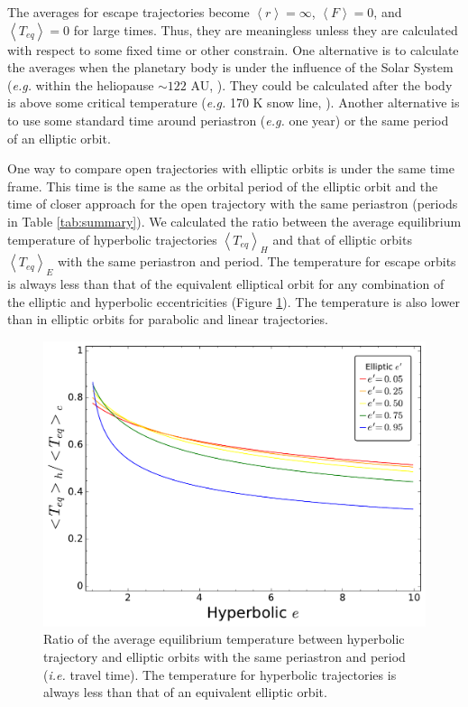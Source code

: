 \documentclass[a4paper,fleqn,usenatbib]{mnras}
\begin{document}
The averages for escape trajectories become $\left<r\right>=\infty$, $\left<F\right>=0$, and $\left<T_{eq}\right>=0$ for large times. Thus, they are meaningless unless they are calculated with respect to some fixed time or other constrain. One alternative is to calculate the averages when the planetary body is under the influence of the Solar System (\emph{e.g.} within the heliopause $\sim122$ AU, \citet{2017ApJ...834..197C}). They could be calculated after the body is above some critical temperature (\emph{e.g.} 170 K snow line, \citet{2008ApJ...673..502K}). Another alternative is to use some standard time around periastron (\emph{e.g.} one year) or the same period of an elliptic orbit.

One way to compare open trajectories with elliptic orbits is under the same time frame. This time is the same as the orbital period of the elliptic orbit and the time of closer approach for the open trajectory with the same periastron (periods in Table \ref{tab:summary}). We calculated the ratio between the average equilibrium temperature of hyperbolic trajectories $\left<T_{eq}\right>_H$ and that of elliptic orbits $\left<T_{eq}\right>_E$ with the same periastron and period. The temperature for escape orbits is always less than that of the equivalent elliptical orbit for any combination of the elliptic and hyperbolic eccentricities (Figure \ref{fig4}). The temperature is also lower than in elliptic orbits for parabolic and linear trajectories.

\begin{figure}
\includegraphics[width=\columnwidth]{f4.pdf}
\caption{Ratio of the average equilibrium temperature between hyperbolic trajectory and elliptic orbits with the same periastron and period (\emph{i.e.} travel time). The temperature for hyperbolic trajectories is always less than that of an equivalent elliptic orbit.}
\label{fig4}
\end{figure}
\end{document}
